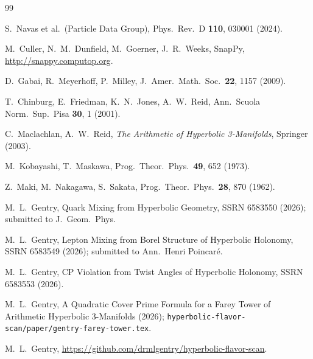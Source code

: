 \documentclass[11pt,a4paper]{article}
\theoremstyle{definition}
\theoremstyle{remark}
\begin{document}
\begin{thebibliography}{99}

S.~Navas et al.\ (Particle Data Group),
Phys.\ Rev.\ D \textbf{110}, 030001 (2024).

M.~Culler, N.~M.~Dunfield, M.~Goerner, J.~R.~Weeks,
SnapPy, \url{http://snappy.computop.org}.

D.~Gabai, R.~Meyerhoff, P.~Milley,
J.\ Amer.\ Math.\ Soc.\ \textbf{22}, 1157 (2009).

T.~Chinburg, E.~Friedman, K.~N.~Jones, A.~W.~Reid,
Ann.\ Scuola Norm.\ Sup.\ Pisa \textbf{30}, 1 (2001).

C.~Maclachlan, A.~W.~Reid,
\emph{The Arithmetic of Hyperbolic 3-Manifolds},
Springer (2003).

M.~Kobayashi, T.~Maskawa,
Prog.\ Theor.\ Phys.\ \textbf{49}, 652 (1973).

Z.~Maki, M.~Nakagawa, S.~Sakata,
Prog.\ Theor.\ Phys.\ \textbf{28}, 870 (1962).

M.~L.~Gentry,
Quark Mixing from Hyperbolic Geometry,
SSRN 6583550 (2026); submitted to J.\ Geom.\ Phys.

M.~L.~Gentry,
Lepton Mixing from Borel Structure of Hyperbolic Holonomy,
SSRN 6583549 (2026); submitted to Ann.\ Henri Poincar\'e.

M.~L.~Gentry,
CP Violation from Twist Angles of Hyperbolic Holonomy,
SSRN 6583553 (2026).

M.~L.~Gentry,
A Quadratic Cover Prime Formula for a Farey Tower
of Arithmetic Hyperbolic 3-Manifolds (2026);
\texttt{hyperbolic-flavor-scan/paper/gentry-farey-tower.tex}.

M.~L.~Gentry,
\url{https://github.com/drmlgentry/hyperbolic-flavor-scan}.

\end{thebibliography}
\end{document}
